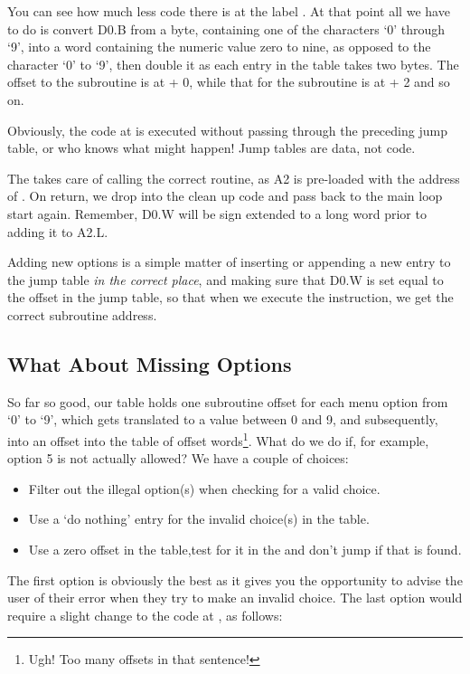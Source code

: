 You can see how much less code there is at the label . At that point all we have to do is convert D0.B from a byte, containing one of the characters `0' through `9', into a word containing the numeric value zero to nine, as opposed to the character `0' to `9', then double it as each entry in the table takes two bytes. The offset to the  subroutine is at  + 0, while that for the  subroutine is at  + 2 and so on.

Obviously, the code at  is executed without passing through the preceding jump table, or who knows what might happen! Jump tables are data, not code.

The  takes care of calling the correct routine, as A2 is pre-loaded with the address of . On return, we drop into the clean up code and pass back to the main loop start again. Remember, D0.W will be sign extended to a long word prior to adding it to A2.L.

Adding new options is a simple matter of inserting or appending a new entry to the jump table \emph{in the correct place}, and making sure that D0.W is set equal to the offset in the jump table, so that when we execute the  instruction, we get the correct subroutine address.

\subsection{What About Missing Options}
So far so good, our table holds one subroutine offset for each menu option from `0' to `9', which gets translated to a value between 0 and 9, and subsequently, into an offset into the table of offset words\footnote{Ugh! Too many offsets in that sentence!}. What do we do if, for example, option 5 is not actually allowed? We have a couple of choices:

\begin{itemize}
\item Filter out the illegal option(s) when checking for a valid choice.
\item Use a `do nothing' entry for the invalid choice(s) in the table.
\item Use a zero offset in the table,test for it in the  and don't jump if that is found.
\end{itemize}

The first option is obviously the best as it gives you the opportunity to advise the user of their error when they try to make an invalid choice. The last option would require a slight change to the code at , as follows:

